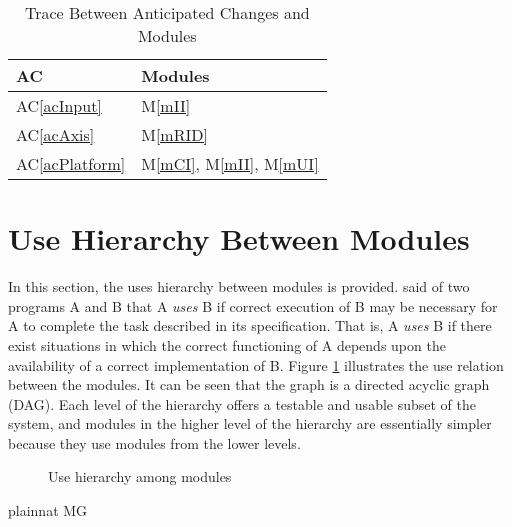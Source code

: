 \documentclass[12pt, titlepage]{article}
\newcommand{\acref}[1]{AC\ref{#1}}
\newcommand{\mref}[1]{M\ref{#1}}
\begin{document}
\begin{table}[H]
\centering
\begin{tabular}{p{} p{}}
\toprule
\textbf{AC} & \textbf{Modules}\\
\midrule
\acref{acInput} & \mref{mII}\\
\acref{acAxis} & \mref{mRID}\\
\acref{acPlatform} & \mref{mCI}, \mref{mII}, \mref{mUI} \\
\bottomrule
\end{tabular}
\caption{Trace Between Anticipated Changes and Modules}
\label{TblACT}
\end{table}

\section{Use Hierarchy Between Modules} \label{SecUse}

In this section, the uses hierarchy between modules is
provided. \citet{Parnas1978} said of two programs A and B that A {\em uses} B if
correct execution of B may be necessary for A to complete the task described in
its specification. That is, A {\em uses} B if there exist situations in which
the correct functioning of A depends upon the availability of a correct
implementation of B.  Figure \ref{FigUH} illustrates the use relation between
the modules. It can be seen that the graph is a directed acyclic graph
(DAG). Each level of the hierarchy offers a testable and usable subset of the
system, and modules in the higher level of the hierarchy are essentially simpler
because they use modules from the lower levels.

\begin{figure}[H]
\centering
\caption{Use hierarchy among modules}
\label{FigUH}
\end{figure}


 {plainnat}
 {MG}
\end{document}
